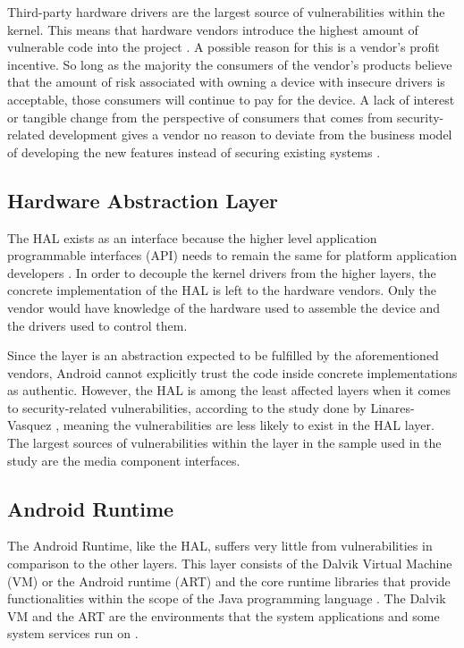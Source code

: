 Third-party hardware drivers are the largest source of vulnerabilities within the kernel.
This means that hardware vendors introduce the highest amount of vulnerable code into the project \cite{LinaresVasquez2017}.
A possible reason for this is a vendor's profit incentive.
So long as the majority the consumers of the vendor's products believe that the amount of risk associated with owning a device with insecure drivers is acceptable, those consumers will continue to pay for the device.
A lack of interest or tangible change from the perspective of consumers that comes from security-related development gives a vendor no reason to deviate from the business model of developing the new features instead of securing existing systems \cite{Witten2001}.

\subsection{Hardware Abstraction Layer}
The HAL exists as an interface because the higher level application programmable interfaces (API) needs to remain the same for platform application developers \cite{AndroidDocs2022Arch}.
In order to decouple the kernel drivers from the higher layers, the concrete implementation of the HAL is left to the hardware vendors.
Only the vendor would have knowledge of the hardware used to assemble the device and the drivers used to control them.

Since the layer is an abstraction expected to be fulfilled by the aforementioned vendors, Android cannot explicitly trust the code inside concrete implementations as authentic.
However, the HAL is among the least affected layers when it comes to security-related vulnerabilities, according to the study done by Linares-Vasquez \etal \cite{LinaresVasquez2017}, meaning the vulnerabilities are less likely to exist in the HAL layer.
The largest sources of vulnerabilities within the layer in the sample used in the study are the media component interfaces.

\subsection{Android Runtime}
The Android Runtime, like the HAL, suffers very little from vulnerabilities in comparison to the other layers.
This layer consists of the Dalvik Virtual Machine (VM) or the Android runtime (ART) and the core runtime libraries that provide functionalities within the scope of the Java programming language \cite{JavaDocs2022}.
The Dalvik VM and the ART are the environments that the system applications and some system services run on \cite{AndroidDocs2022Arch}.

